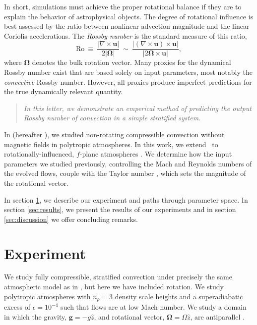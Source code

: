\documentclass[twocolumn, amsmath, amsfonts, amssymb, trackchanges]{aastex62}
\begin{document}
In short, simulations must achieve the proper rotational balance if they are to explain 
the behavior of astrophysical objects. 
The degree of rotational influence is best assessed by the ratio between 
nonlinear advection magnitude and the linear Coriolis accelerations. 
The \textit{Rossby number} is the standard measure of this ratio, 
\begin{equation}
\text{Ro} \ \equiv \ \frac{| \nabla \times \boldsymbol{u} | }{2 |\bm{\Omega}|} \ 
\sim \ \frac{| (\nabla \times \boldsymbol{u}) \times \boldsymbol{u}  | }{|2 \bm{\Omega} \times \boldsymbol{u}|},
\label{eqn:rossby-def}
\end{equation}
where $\bm{\Omega}$ denotes the bulk rotation vector. 
Many proxies for the dynamical Rossby number exist that are based solely on input parameters, most notably the \textit{convective} Rossby number. 
However, all proxies produce imperfect predictions for the true dynamically relevant quantity.
\begin{quote}
\emph{In this letter, we demonstrate an emperical method of predicting the output Rossby number
of convection in a simple stratified system.}
\end{quote}
In \cite{anders&brown2017} (hereafter \AB), we studied non-rotating compressible convection without magnetic fields in polytropic atmospheres. 
In this work, we extend \AB$\,$ to rotationally-influenced, $f$-plane
atmospheres 
\cite[e.g.][]{brummell&all1996, brummell&all1998, calkins&all2015a}. 
We determine how the input parameters we studied previously, controlling the Mach and
Reynolds numbers of the evolved flows, couple with the Taylor number \citep[Ta, ][]{julien&all1996}, which sets the magnitude of the rotational vector. 

In section  \ref{sec:experiment}, we describe our experiment and paths through parameter space. 
In section \ref{sec:results}, we present the results of our experiments and in section \ref{sec:discussion} we offer concluding remarks.

\section{Experiment} 
\label{sec:experiment}
We study fully compressible, stratified 
convection under precisely the same atmospheric model
as in \AB, but here
we have included rotation. We study polytropic atmospheres
with $n_\rho = 3$ density scale heights and a superadiabatic
excess of $\epsilon = 10^{-4}$ such that flows are at low Mach number.
We study a domain in which the
gravity, $\bm{g} = -g\hat{z}$, and rotational vector, $\bm{\Omega} = \Omega \hat{z}$, 
are antiparallel \citep[as in e.g.,][]{julien&all1996, brummell&all1996}.
\end{document}
